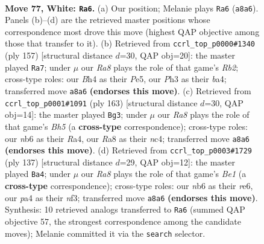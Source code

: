 \documentclass[11pt]{article}
\begin{document}
\clearpage

\begin{figure}[p]\centering
\begin{subfigure}{0.46\textwidth}\centering
\resizebox{\linewidth}{!}{%
\newchessgame
\chessboard[
  setfen={R7/6k1/1n6/3r4/p4P1B/P6P/6K1/8 w - - 9 77},
  showmover=false,
  pgfstyle=straightmove, color=movearrow, markmove={a8-a6}
]}
\caption{}
\end{subfigure}\hfill
\begin{subfigure}{0.46\textwidth}\centering
\resizebox{\linewidth}{!}{%
\newchessgame
\chessboard[
  setfen={7k/1r6/3N4/2p1p3/B1P3pP/6P1/8/7K b - - 0 79},
  showmover=false,
  pgfstyle=straightmove, color=movearrow, markmove={b7-a7}
]}
\caption{}
\end{subfigure}
\\[4pt]
\begin{subfigure}{0.46\textwidth}\centering
\resizebox{\linewidth}{!}{%
\newchessgame
\chessboard[
  setfen={5k2/8/8/3K1p1p/r1N4b/5P2/P6R/8 b - - 1 82},
  showmover=false,
  pgfstyle=straightmove, color=movearrow, markmove={h4-g3}
]}
\caption{}
\end{subfigure}\hfill
\begin{subfigure}{0.46\textwidth}\centering
\resizebox{\linewidth}{!}{%
\newchessgame
\chessboard[
  setfen={1k2b2r/1p5P/4R3/3p4/8/5NK1/8/8 b - - 6 69},
  showmover=false,
  pgfstyle=straightmove, color=movearrow, markmove={e8-a4}
]}
\caption{}
\end{subfigure}
\caption{\textbf{Move 77, White: \texttt{Ra6}.} (a) Our position; Melanie plays \texttt{Ra6} (\texttt{a8a6}). Panels (b)--(d) are the retrieved master positions whose correspondence most drove this move (highest QAP objective among those that transfer to it). (b) Retrieved from \texttt{ccrl\_top\_p0000\#1340} (ply 157) [structural distance $d$=30, QAP obj=20]: the master played \texttt{Ra7}; under $\mu$ our \emph{Ra8} plays the role of that game's \emph{Rb2}; cross-type roles: our \emph{B}h4 as their \emph{P}e5, our \emph{P}h3 as their \emph{b}a4; transferred move \texttt{a8a6} \textbf{(endorses this move)}. (c) Retrieved from \texttt{ccrl\_top\_p0001\#1091} (ply 163) [structural distance $d$=30, QAP obj=14]: the master played \texttt{Bg3}; under $\mu$ our \emph{Ra8} plays the role of that game's \emph{Bh5} (a \textbf{cross-type} correspondence); cross-type roles: our \emph{n}b6 as their \emph{R}a4, our \emph{R}a8 as their \emph{n}c4; transferred move \texttt{a8a6} \textbf{(endorses this move)}. (d) Retrieved from \texttt{ccrl\_top\_p0003\#1729} (ply 137) [structural distance $d$=29, QAP obj=12]: the master played \texttt{Ba4}; under $\mu$ our \emph{Ra8} plays the role of that game's \emph{Be1} (a \textbf{cross-type} correspondence); cross-type roles: our \emph{n}b6 as their \emph{r}e6, our \emph{p}a4 as their \emph{n}f3; transferred move \texttt{a8a6} \textbf{(endorses this move)}. Synthesis: 10 retrieved analogs transferred to \texttt{Ra6} (summed QAP objective 57, the strongest correspondence among the candidate moves); Melanie committed it via the \texttt{search} selector.}
\label{fig:thought-m152}
\end{figure}
\end{document}
